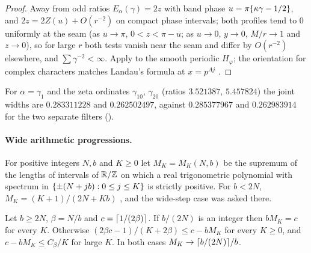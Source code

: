 \begin{proof}
Away from odd ratios $E_\alpha(\gamma)=2z$ with band phase $u=\pi\{\kappa\gamma-1/2\}$, and $2z=2Z(u)+O(r^{-2})$ on compact phase intervals;
both profiles tend to $0$ uniformly at the seam (as $u\to\pi$, $0<z<\pi-u$; as $u\to0$, $y\to0$, $M/r\to1$ and $z\to0$), so
for large $r$ both tests vanish near the seam and differ by $O(r^{-2})$ elsewhere, and $\sum\gamma^{-2}<\infty$. Apply
\cite[Thm.~5, (3.2)]{FordSoundararajanZaharescu2009Distribution} to the smooth periodic $H_\varphi$; the orientation for complex
characters matches Landau's formula at $x=p^{Aj}$ \cite{Landau1911Nullstellen}.
\end{proof}

For $\alpha=\gamma_1$ and the zeta ordinates $\gamma_{10}$, $\gamma_{20}$ (ratios $3.521387$, $5.457824$) the joint widths are $0.283311228$ and
$0.262502497$, against $0.285377967$ and $0.262983914$ for the two separate filters
().

\paragraph{Wide arithmetic progressions.}
For positive integers $N,b$ and $K\ge0$ let $M_K=M_K(N,b)$ be the supremum of the lengths of intervals of $\mathbb{R}/\mathbb{Z}$ on which
a real trigonometric polynomial with spectrum in $\{\pm(N+jb):0\le j\le K\}$ is strictly positive. For $b<2N$,
$M_K=(K+1)/(2N+Kb)$ \cite[Thm.~3]{KozmaOravecz2003Gaps}, and the wide-step case was asked there.

\begin{theorem}\label{rec:thm:wide}
Let $b\ge2N$, $\beta=N/b$ and $c=\lceil1/(2\beta)\rceil$. If $b/(2N)$ is an integer then $bM_K=c$ for every $K$. Otherwise
$(2\beta c-1)/(K+2\beta)\le c-bM_K$ for every $K\ge0$, and $c-bM_K\le C_\beta/K$ for large $K$. In both cases $M_K\to\lceil b/(2N)\rceil/b$.
\end{theorem}

